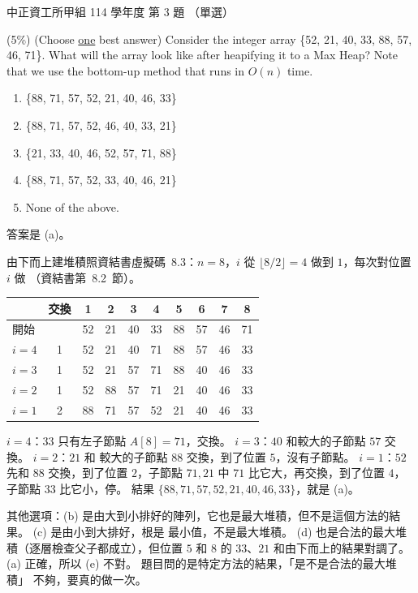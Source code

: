 \begin{pastexam}[label={px:ccu-114-swa-03}]{中正資工所甲組 114 學年度 第 3 題}
（單選）

(5\%) (Choose \underline{one} best answer) Consider the integer array \{52, 21, 40, 33, 88, 57, 46, 71\}.
What will the array look like after heapifying it to a Max Heap? Note that we use the bottom-up method
that runs in $O(n)$ time.
\begin{enumerate}[label=(\alph*)]
\item \{88, 71, 57, 52, 21, 40, 46, 33\}
\item \{88, 71, 57, 52, 46, 40, 33, 21\}
\item \{21, 33, 40, 46, 52, 57, 71, 88\}
\item \{88, 71, 57, 52, 33, 40, 46, 21\}
\item None of the above.
\end{enumerate}
\end{pastexam}

\begin{pastsoln}
答案是 (a)。

由下而上建堆積照資結書虛擬碼~8.3：$n = 8$，$i$ 從 $\lfloor 8/2 \rfloor = 4$ 做到 $1$，每次對位置 $i$
做 （資結書第~8.2~節）。

\begin{center}
\begin{tabular}{lc*{8}{c}}
\toprule
& 交換 & 1 & 2 & 3 & 4 & 5 & 6 & 7 & 8 \\
\midrule
開始 & & 52 & 21 & 40 & 33 & 88 & 57 & 46 & 71 \\
$i = 4$ & 1 & 52 & 21 & 40 & 71 & 88 & 57 & 46 & 33 \\
$i = 3$ & 1 & 52 & 21 & 57 & 71 & 88 & 40 & 46 & 33 \\
$i = 2$ & 1 & 52 & 88 & 57 & 71 & 21 & 40 & 46 & 33 \\
$i = 1$ & 2 & 88 & 71 & 57 & 52 & 21 & 40 & 46 & 33 \\
\bottomrule
\end{tabular}
\end{center}

$i = 4$：$33$ 只有左子節點 $A[8] = 71$，交換。 $i = 3$：$40$ 和較大的子節點 $57$ 交換。 $i = 2$：$21$ 和
較大的子節點 $88$ 交換，到了位置 $5$，沒有子節點。 $i = 1$：$52$ 先和 $88$ 交換，到了位置 $2$，子節點
$71, 21$ 中 $71$ 比它大，再交換，到了位置 $4$，子節點 $33$ 比它小，停。 結果
$\{88, 71, 57, 52, 21, 40, 46, 33\}$，就是 (a)。

其他選項：(b) 是由大到小排好的陣列，它也是最大堆積，但不是這個方法的結果。 (c) 是由小到大排好，根是
最小值，不是最大堆積。 (d) 也是合法的最大堆積（逐層檢查父子都成立），但位置 $5$ 和 $8$ 的 $33$、$21$
和由下而上的結果對調了。 (a) 正確，所以 (e) 不對。 題目問的是特定方法的結果，「是不是合法的最大堆積」
不夠，要真的做一次。
\end{pastsoln}
